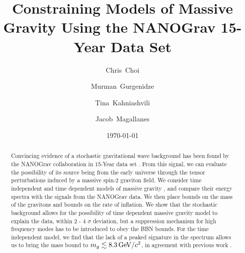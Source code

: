 \documentclass[prd,twocolumn,aps,psfig,nofootinbib,nobibnotes,superscriptaddress,preprintnumbers,times]{revtex4-2}
\newcommand{\GeV}{\,{\rm GeV}}
\begin{document}
\title{Constraining Models of Massive Gravity Using the NANOGrav 15-Year Data Set}

\date{\today}
\author{Chris~Choi}

\author{Murman~Gurgenidze}

\author{Tina~Kahniashvili}

\author{Jacob~Magallanes}

\begin{abstract}
Convincing evidence of a stochastic gravitational wave background has been found by the NANOGrav collaboration in 15-Year data set \cite{Agazie:2023}. From this signal, we can evaluate the possibility of its source being from the early universe through the tensor perturbations induced by a massive spin-2 graviton field. We consider time independent and time dependent models of massive gravity \cite{Fujita:2018,Gumrukcuoglu:2012}, and compare their energy spectra with the signals from the NANOGrav data. We then place bounds on the mass of the gravitons and bounds on the rate of inflation. We show that the stochastic background allows for the possibility of time dependent massive gravity model to explain the data, within 2 - 4 $\sigma$ deviation, but a suppression mechanism for high frequency modes has to be introduced to obey the BBN bounds. For the time independent model, we find that the lack of a peaked signature in the spectrum allows us to bring the mass bound to $m_g \lesssim 8.3 \GeV/c^2$, in agreement with previous work \cite{deRham:2017,Wang:2023, Wu:2023}.
\end{abstract}

\maketitle
\end{document}
